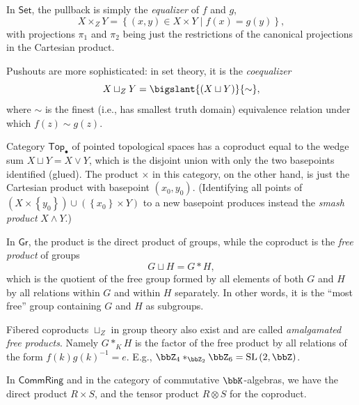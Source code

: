 %
\begin{example}\label{pullbacks in Set}
    In $\mathsf{Set}$, the pullback is simply the \emph{equalizer}
    of $f$ and $g$, 
    \[
    X\times_{Z}Y=\left\{ \left(x,y\right)\in X\times Y\mid f(x)=g(y)\right\} ,
    \]
    with projections $\pi_{1}$ and $\pi_{2}$ being just the restrictions
    of the canonical projections in the Cartesian product.

    Pushouts are more sophisticated: in set theory, it is the \emph{coequalizer}
    \[
    X\sqcup_{Z}Y=\bigslant{\left(X\sqcup Y\right)}{\sim},
    \]
    where $\sim$ is the finest (i.e., has smallest truth domain) equivalence
    relation under which $f(z)\sim g(z)$.
\end{example}
%
\begin{example}
    Category $\mathsf{Top}_{\bullet}$ of pointed topological spaces has
    a coproduct equal to the wedge sum $X\sqcup Y=X\vee Y$, which is
    the disjoint union with only the two basepoints identified (glued).
    The product $\times$ in this category, on the other hand, is just the
    Cartesian product with basepoint $(x_0,y_0)$. (Identifying all points of $\left(X\times\left\{ y_0\right\} \right)\cup\left(\left\{ x_0\right\} \times Y\right)$
    to a new basepoint produces instead the \emph{smash product} $X\wedge Y$.)
\end{example}
%
\begin{example}\label{pushouts in groups}
    In $\mathsf{Gr}$, the product is the direct product of groups, while
    the coproduct is the \emph{free product} of groups 
    \[
    G\sqcup H=G\ast H,
    \]
    which is the quotient of the free group formed by all elements of
    both $G$ and $H$ by all relations within $G$ and within $H$ separately.
    In other words, it is the ``most free'' group containing $G$ and
    $H$ as subgroups. 

    Fibered coproducts $\sqcup_{Z}$ in group theory also exist and are
    called \emph{amalgamated free products}. Namely $G\ast_K H$ is the factor of the free product by all relations of the form $f(k)g(k)^{-1}=e$. E.g., $\bbZ_{4}\ast_{\bbZ_{2}}\bbZ_{6}=\mathrm{SL}\left(2,\bbZ\right)$.
\end{example}
%
\begin{example}
    In $\mathsf{CommRing}$ and in the category of commutative $\bbK$-algebras, we have the direct product
    $R\times S$, and the tensor product $R\otimes S$ for the coproduct.
\end{example}

